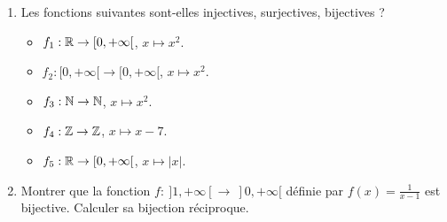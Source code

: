 \begin{frame}
\begin{miniexercice}
\begin{enumerate}
  \item Les fonctions suivantes sont-elles injectives, surjectives, bijectives ? 
\begin{itemize}
  \item $f_1 : \mathbb{R} \to [0,+\infty[$, $x \mapsto x^2$.
  \item $f_2 : [0,+\infty[ \to [0,+\infty[$, $x \mapsto x^2$.
  \item $f_3 : \mathbb{N} \to \mathbb{N}$, $x \mapsto x^2$.
  \item $f_4 : \mathbb{Z} \to \mathbb{Z}$, $x \mapsto x-7$.
  \item $f_5 : \mathbb{R} \to [0, +\infty[$, $x \mapsto |x|$.
\end{itemize}

  \item Montrer que la fonction $f : \  ]1,+\infty[ \to \ ]0,+\infty[$ définie par $f(x)=\frac{1}{x-1}$ 
  est bijective. Calculer sa bijection réciproque.
\end{enumerate}
\end{miniexercice}
\end{frame}




